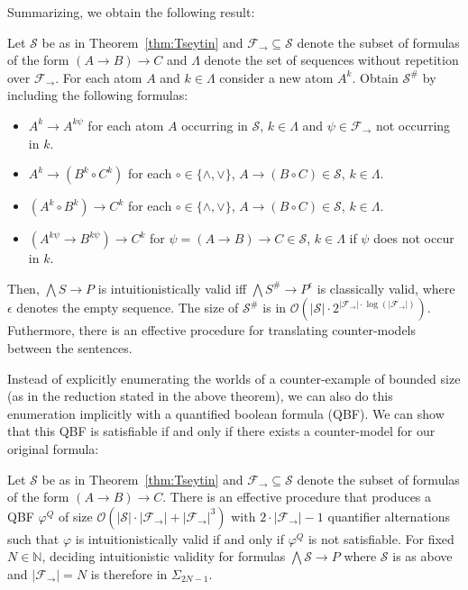 \documentclass[runningheads]{llncs}
\begin{document}
Summarizing, we obtain the following result:

\begin{theorem}
\label{thm:reduction-propositional}
	Let $\mathcal S$ be as in Theorem~\ref{thm:Tseytin} and $\mathcal F_\to\subseteq\mathcal S$ denote the subset of formulas of the form $(A\to B)\to C$ and $\Lambda$ denote the set of sequences without repetition over $\mathcal F_\to$. For each atom $A$ and $k\in\Lambda$ consider a new atom $A^k$. Obtain $\mathcal S^\#$ by including the following formulas:
	\begin{itemize}
		\item $A^k\to A^{k\psi}$ for each atom $A$ occurring in $\mathcal S$, $k\in\Lambda$ and $\psi\in\mathcal F_\to$ not occurring in $k$.
		\item $A^k\to (B^k\circ C^k)$ for each $\circ\in\{\wedge,\vee\}$, $A\to (B\circ C)\in\mathcal S$, $k\in\Lambda$.
		\item $(A^k\circ B^k)\to C^k$ for each $\circ\in\{\wedge,\vee\}$, $A\to (B\circ C)\in\mathcal S$, $k\in\Lambda$.
		\item $(A^{k\psi}\to B^{k\psi})\to C^k$ for $\psi = (A\to B)\to C\in\mathcal S$, $k\in\Lambda$ if $\psi$ does not occur in $k$.
	\end{itemize}
Then, $\bigwedge S\to P$ is intuitionistically valid iff $\bigwedge S^\#\to P^\epsilon$ is classically valid, where $\epsilon$ denotes the empty sequence. The size of $\mathcal S^\#$ is in $\mathcal O(|\mathcal S|\cdot2^{|\mathcal F_\to|\cdot\log(|\mathcal F_\to|)})$. Futhermore, there is an effective procedure for translating counter-models between the sentences.
\end{theorem}

Instead of explicitly enumerating the worlds of a counter-example of bounded size (as in the reduction stated in the above theorem), we can also do this enumeration implicitly with a quantified boolean formula (QBF).
We can show that this QBF is satisfiable if and only if there exists a counter-model for our original formula:

\begin{theorem}
	Let $\mathcal S$ be as in Theorem~\ref{thm:Tseytin} and $\mathcal F_\to\subseteq\mathcal S$ denote the subset of formulas of the form $(A\to B)\to C$. There is an effective procedure that produces a QBF $\varphi^Q$ of size $\mathcal O(|\mathcal S|\cdot|\mathcal F_\to| + |\mathcal F_\to|^3)$ with $2\cdot |\mathcal F_\to|-1$ quantifier alternations such that $\varphi$ is intuitionistically valid if and only if $\varphi^Q$ is not satisfiable. For fixed $N\in\mathbb N$, deciding intuitionistic validity for formulas $\bigwedge \mathcal S\to P$ where $\mathcal S$ is as above and $|\mathcal F_\to| = N$ is therefore in $\Sigma_{2N-1}$.
\end{theorem}
\end{document}
